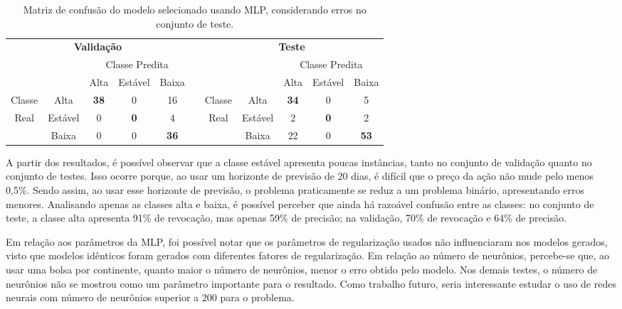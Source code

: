 \documentclass[12pt,a4paper,utf8]{ppgsi}
\begin{document}
    \begin{table}[htb]
    \caption{Matriz de confusão do modelo selecionado usando MLP, considerando erros no conjunto de teste.}
    \label{tab:confusao-mlp}
    \centering
    \begin{tabular}{|ccccc|c|ccccc|}
		\cline{1-5} \cline{7-11}
		\multicolumn{5}{|c|}{\textbf{Validação}} & & \multicolumn{5}{|c|}{\textbf{Teste}} \\ 
		\cline{1-5} \cline{7-11}
                      &   & \multicolumn{3}{c|}{Classe Predita} & & &  & \multicolumn{3}{c|}{Classe Predita} \\
               &   & Alta  & Estável   & Baixa & &   & & Alta  & Estável   & Baixa    \\
Classe & Alta & \textbf{38}    & 0     & 16 & 	&			Classe   & Alta & \textbf{34}    & 0     & 5\\
Real   & Estável & 0   & \textbf{0}    & 4 & 		&			Real& Estável & 2   & \textbf{0}    & 2   \\
                                & Baixa & 0    & 0 & \textbf{36}   & && Baixa & 22    & 0 & \textbf{53}  \\
\cline{1-5} \cline{7-11}
    \end{tabular}
    \end{table}
		
		A partir dos resultados, é possível observar que a classe estável apresenta poucas instâncias, tanto no conjunto de validação quanto no conjunto de testes. Isso ocorre porque, ao usar um horizonte de previsão de 20 dias, é difícil que o preço da ação não mude pelo menos 0,5\%. Sendo assim, ao usar esse horizonte de previsão, o problema praticamente se reduz a um problema binário, apresentando erros menores. Analisando apenas as classes alta e baixa, é possível perceber que ainda há razoável confusão entre as classes: no conjunto de teste, a classe alta apresenta 91\% de revocação, mas apenas 59\% de precisão; na validação, 70\% de revocação e 64\% de precisão. 
						
            Em relação aos parâmetros da MLP, foi possível notar que os parâmetros de regularização usados não influenciaram nos modelos gerados, visto que modelos idênticos foram gerados com diferentes fatores de regularização. Em relação ao número de neurônios, percebe-se que, ao usar uma bolsa por continente, quanto maior o número de neurônios, menor o erro obtido pelo modelo. Nos demais testes, o número de neurônios não se mostrou como um parâmetro importante para o resultado. Como trabalho futuro, seria interessante estudar o uso de redes neurais com número de neurônios superior a 200 para o problema.
\end{document}
